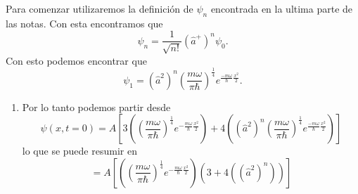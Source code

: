 \documentclass[12pt]{exam}
\begin{document}
\begin{enumerate}
    Para comenzar utilizaremos la definición de $\psi_n$ encontrada en la ultima parte de las notas. Con esta encontramos que  \[
      \psi_n = \frac{1}{\sqrt{n!}} (\hat{a}^+)^n\psi_0
    .\] Con esto podemos encontrar que \[
    \psi_1 = (\hat{a}^2)^n\left( \frac{m\omega}{\pi\hbar} \right)^{\frac{1}{4}}e^{\frac{-m\omega}{\hbar}\frac{x^2}{2}}
    .\]
    \begin{enumerate}
    \item Por lo tanto podemos partir desde \[\psi(x,t=0) = A \left[ 3\left(\left( \frac{m\omega}{\pi\hbar} \right)^{\frac{1}{4}}e^{-\frac{m\omega}{\hbar}\frac{x^2}{2}} \right) + 4\left( (\hat{a}^2)^n\left( \frac{m\omega}{\pi\hbar} \right)^{\frac{1}{4}}e^{\frac{-m\omega}{\hbar}\frac{x^2}{2}} \right)  \right]\] 
      lo que se puede resumir en \[
      = A\left[ \left(\left( \frac{m\omega}{\pi\hbar} \right)^{\frac{1}{4}}e^{-\frac{m\omega}{\hbar}\frac{x^2}{2}} \right)\left(3 + 4\left( (\hat{a}^2)^n \right)\right)  \right]\]


\end{enumerate}
\end{enumerate}
\end{document}
